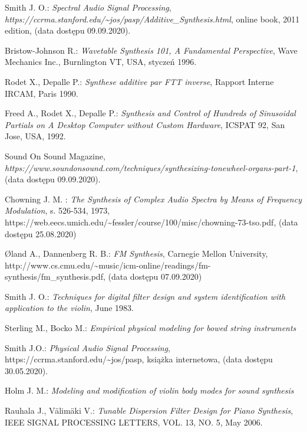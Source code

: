 \documentclass[nostrict]{szablonPG}
\begin{document}
\begin{thebibliography}{20}
		Smith J. O.: \emph{Spectral Audio Signal Processing}, \emph{https://ccrma.stanford.edu/\textasciitilde jos/pasp/Additive\_Synthesis.html}, online book, 2011 edition, (data dostępu 09.09.2020).
		
		Bristow-Johnson R.: \emph{Wavetable Synthesis 101, A Fundamental Perspective}, Wave Mechanics Inc., Burnlington VT, USA, styczeń 1996.
		
		Rodet X., Depalle P.: \emph{Synthese additive par FTT inverse}, Rapport Interne IRCAM, Paris 1990.
		
		Freed A., Rodet X., Depalle P.: \emph{Synthesis and Control of Hundreds of Sinusoidal Partials on A Desktop Computer without Custom Hardware}, ICSPAT 92, San Jose, USA, 1992.
		
		Sound On Sound Magazine, \emph{https://www.soundonsound.com/techniques/synthesizing-tonewheel-organs-part-1}, (data dostępu 09.09.2020).
		
		Chowning J. M. : \emph{The Synthesis of Complex Audio Spectra by Means of Frequency Modulation}, s. 526-534, 1973, https://web.eecs.umich.edu/\textasciitilde fessler/course/100/misc/chowning-73-tso.pdf, (data dostępu 25.08.2020)
		
		Øland A., Dannenberg R. B.: \emph{FM Synthesis}, Carnegie Mellon University, http://www.cs.cmu.edu/\textasciitilde music/icm-online/readings/fm-synthesis/fm\_synthesis.pdf, (data dostępu 07.09.2020)
		
		Smith J. O.: \emph{Techniques for digital filter design and system identification with application to the violin}, June 1983.
		
		Sterling M., Bocko M.: \emph{Empirical physical modeling for bowed string instruments}
		
		Smith J.O.: \emph{Physical Audio Signal Processing}, https://ccrma.stanford.edu/\textasciitilde jos/pasp, książka internetowa, (data dostępu 30.05.2020).
		
		Holm J. M.: \emph{Modeling and modification of violin body modes for sound synthesis}
			
		Rauhala J., Välimäki V.: \emph{Tunable Dispersion Filter Design for Piano Synthesis}, IEEE SIGNAL PROCESSING LETTERS, VOL. 13, NO. 5, May 2006.
		

\end{thebibliography}
\end{document}

